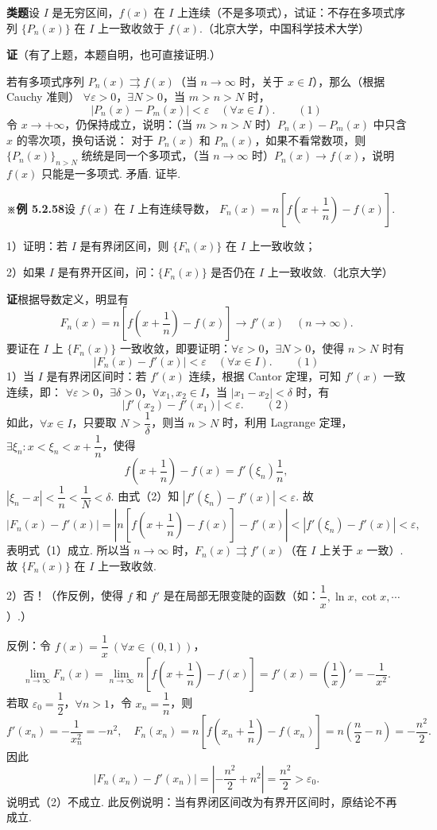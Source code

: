 \documentclass[UTF8,12pt,a4paper,fontset=fandol]{ctexart}
\begin{document}
\noindent\textbf{类题}\quad 设 $I$ 是无穷区间，$f(x)$ 在 $I$ 上连续（不是多项式），试证：不存在多项式序列
$\{P_n(x)\}$ 在 $I$ 上一致收敛于 $f(x)$.（北京大学，中国科学技术大学）

\noindent\textbf{证}\quad （有了上题，本题自明，也可直接证明.）

若有多项式序列 $P_n(x)\rightrightarrows f(x)$（当 $n\to\infty$ 时，关于 $x\in I$），那么（根据 Cauchy 准则）
$\forall\varepsilon>0$，$\exists N>0$，当 $m>n>N$ 时，
\[
  |P_n(x)-P_m(x)|<\varepsilon\quad(\forall x\in I).
\qquad(1)
\]
令 $x\to+\infty$，仍保持成立，说明：（当 $m>n>N$ 时）$P_n(x)-P_m(x)$ 中只含 $x$ 的零次项，换句话说：
对于 $P_n(x)$ 和 $P_m(x)$，如果不看常数项，则 $\{P_n(x)\}_{n>N}$ 统统是同一个多项式，（当
$n\to\infty$ 时）$P_n(x)\to f(x)$，说明 $f(x)$ 只能是一多项式. 矛盾. 证毕.

\noindent\textbf{※例 5.2.58}\quad 设 $f(x)$ 在 $I$ 上有连续导数，
$F_n(x)=n\left[f\left(x+\dfrac1n\right)-f(x)\right]$.

1）证明：若 $I$ 是有界闭区间，则 $\{F_n(x)\}$ 在 $I$ 上一致收敛；

2）如果 $I$ 是有界开区间，问：$\{F_n(x)\}$ 是否仍在 $I$ 上一致收敛.（北京大学）

\noindent\textbf{证}\quad 根据导数定义，明显有
\[
  F_n(x)=n\left[f\left(x+\frac1n\right)-f(x)\right]\to f'(x)\quad(n\to\infty).
\]
要证在 $I$ 上 $\{F_n(x)\}$ 一致收敛，即要证明：$\forall\varepsilon>0$，$\exists N>0$，使得 $n>N$ 时有
\[
  |F_n(x)-f'(x)|<\varepsilon\quad(\forall x\in I).
\qquad(1)
\]
1）当 $I$ 是有界闭区间时：若 $f'(x)$ 连续，根据 Cantor 定理，可知 $f'(x)$ 一致连续，即：
$\forall\varepsilon>0$，$\exists\delta>0$，$\forall x_1,x_2\in I$，当 $|x_1-x_2|<\delta$ 时，有
\[
  |f'(x_2)-f'(x_1)|<\varepsilon.
\qquad(2)
\]
如此，$\forall x\in I$，只要取 $N>\dfrac1\delta$，则当 $n>N$ 时，利用 Lagrange 定理，
$\exists\xi_n:x<\xi_n<x+\dfrac1n$，使得
\[
  f\left(x+\frac1n\right)-f(x)=f'(\xi_n)\frac1n,
\]
$|\xi_n-x|<\dfrac1n<\dfrac1N<\delta$. 由式（2）知 $|f'(\xi_n)-f'(x)|<\varepsilon$. 故
\[
  |F_n(x)-f'(x)|
  =\left|n\left[f\left(x+\frac1n\right)-f(x)\right]-f'(x)\right|
  <|f'(\xi_n)-f'(x)|<\varepsilon,
\]
表明式（1）成立. 所以当 $n\to\infty$ 时，$F_n(x)\rightrightarrows f'(x)$（在 $I$ 上关于 $x$ 一致）. 故
$\{F_n(x)\}$ 在 $I$ 上一致收敛.

2）否！（作反例，使得 $f$ 和 $f'$ 是在局部无限变陡的函数（如：$\dfrac1x,\ln x,\cot x,\cdots$）.）

反例：令 $f(x)=\dfrac1x\ (\forall x\in(0,1))$，
\[
  \lim_{n\to\infty}F_n(x)
  =\lim_{n\to\infty}n\left[f\left(x+\frac1n\right)-f(x)\right]
  =f'(x)=\left(\frac1x\right)'=-\frac1{x^2}.
\]
若取 $\varepsilon_0=\dfrac12$，$\forall n>1$，令 $x_n=\dfrac1n$，则
\[
  f'(x_n)=-\frac1{x_n^2}=-n^2,\quad
  F_n(x_n)=n\left[f\left(x_n+\frac1n\right)-f(x_n)\right]
  =n\left(\frac n2-n\right)=-\frac{n^2}{2}.
\]
因此
\[
  |F_n(x_n)-f'(x_n)|
  =\left|-\frac{n^2}{2}+n^2\right|
  =\frac{n^2}{2}>\varepsilon_0.
\]
说明式（2）不成立. 此反例说明：当有界闭区间改为有界开区间时，原结论不再成立.
\end{document}
